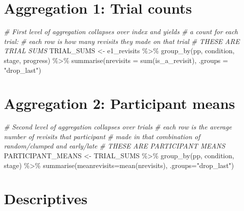 \documentclass[
]{book}
\newenvironment{Shaded}{\begin{snugshade}}{\end{snugshade}}
\newcommand{\AttributeTok}[1]{\textcolor[rgb]{0.77,0.63,0.00}{#1}}
\newcommand{\CommentTok}[1]{\textcolor[rgb]{0.56,0.35,0.01}{\textit{#1}}}
\newcommand{\FunctionTok}[1]{\textcolor[rgb]{0.00,0.00,0.00}{#1}}
\newcommand{\NormalTok}[1]{#1}
\newcommand{\OtherTok}[1]{\textcolor[rgb]{0.56,0.35,0.01}{#1}}
\newcommand{\SpecialCharTok}[1]{\textcolor[rgb]{0.00,0.00,0.00}{#1}}
\newcommand{\StringTok}[1]{\textcolor[rgb]{0.31,0.60,0.02}{#1}}
\begin{document}
\hypertarget{aggregation-1-trial-counts}{%
\section{Aggregation 1: Trial counts}\label{aggregation-1-trial-counts}}

\begin{Shaded}
\begin{Highlighting}[]
\CommentTok{\# First level of aggregation collapses over index and yields }
\CommentTok{\# a count for each trial: }
\CommentTok{\# each row is how many revisits they made on that trial}
\CommentTok{\# THESE ARE TRIAL SUMS}
\NormalTok{TRIAL\_SUMS }\OtherTok{\textless{}{-}}
\NormalTok{  e1\_revisits }\SpecialCharTok{\%\textgreater{}\%} 
  \FunctionTok{group\_by}\NormalTok{(pp, condition, stage, progress) }\SpecialCharTok{\%\textgreater{}\%} 
  \FunctionTok{summarise}\NormalTok{(}\AttributeTok{nrevisits =} \FunctionTok{sum}\NormalTok{(is\_a\_revisit), }\AttributeTok{.groups =} \StringTok{"drop\_last"}\NormalTok{)}
\end{Highlighting}
\end{Shaded}

\hypertarget{aggregation-2-participant-means}{%
\section{Aggregation 2: Participant means}\label{aggregation-2-participant-means}}

\begin{Shaded}
\begin{Highlighting}[]
\CommentTok{\# Second level of aggregation collapses over trials}
\CommentTok{\# each row is the average number of revisits that participant }
\CommentTok{\# made in that combination of random/clumped and early/late}
\CommentTok{\# THESE ARE PARTICIPANT MEANS}
\NormalTok{PARTICIPANT\_MEANS }\OtherTok{\textless{}{-}} 
\NormalTok{  TRIAL\_SUMS }\SpecialCharTok{\%\textgreater{}\%} 
  \FunctionTok{group\_by}\NormalTok{(pp, condition, stage) }\SpecialCharTok{\%\textgreater{}\%} 
  \FunctionTok{summarise}\NormalTok{(}\AttributeTok{meanrevisits=}\FunctionTok{mean}\NormalTok{(nrevisits), }\AttributeTok{.groups=}\StringTok{"drop\_last"}\NormalTok{)}
\end{Highlighting}
\end{Shaded}

\hypertarget{descriptives}{%
\section{Descriptives}\label{descriptives}}
\end{document}

